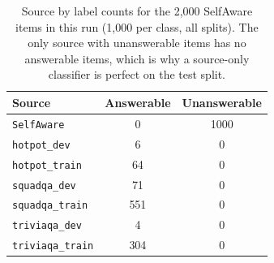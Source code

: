 \begin{table}[H]
\centering\small
\caption{Source by label counts for the 2{,}000 SelfAware items in this run (1{,}000 per class, all splits). The only source with unanswerable items has no answerable items, which is why a source-only classifier is perfect on the test split.}
\label{tab:crosstab}
\begin{tabular}{@{}lcc@{}}
\toprule
Source & Answerable & Unanswerable \\
\midrule
\texttt{SelfAware} & 0 & 1000 \\
\texttt{hotpot\_dev} & 6 & 0 \\
\texttt{hotpot\_train} & 64 & 0 \\
\texttt{squadqa\_dev} & 71 & 0 \\
\texttt{squadqa\_train} & 551 & 0 \\
\texttt{triviaqa\_dev} & 4 & 0 \\
\texttt{triviaqa\_train} & 304 & 0 \\
\bottomrule
\end{tabular}
\end{table}
